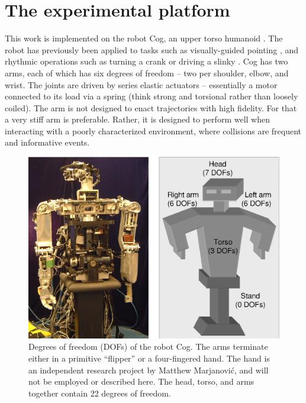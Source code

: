 
\section{The experimental platform}

This work is implemented on the robot Cog, an upper torso humanoid
\cite{brooks99cog}.  The robot has previously been applied to tasks
such as visually-guided pointing \cite{Marjanovic-96-SAB}, and
rhythmic operations such as turning a crank or driving a slinky
\cite{williamson98neural}.  Cog has two arms, each of which has six
degrees of freedom -- two per shoulder, elbow, and wrist.  The joints
are driven by series elastic actuators \cite{williamson95series} --
essentially a motor connected to its load via a spring (think strong
and torsional rather than loosely coiled).  The arm is not designed to
enact trajectories with high fidelity.  For that a very stiff arm is
preferable.  Rather, it is designed to perform well when interacting
with a poorly characterized environment, where collisions are frequent
and informative events.

\begin{figure}[tbh]
\centerline{
\includegraphics[width=12cm]{cog-schematic.eps}
}
\caption{ 
%
  Degrees of freedom (DOFs) of the robot Cog.  The arms terminate
  either in a primitive ``flipper'' or a four-fingered hand.  
\ifverbose
The hand
  is an independent research project by Matthew Marjanovi\'{c}, and
  will not be employed or described here.  
\fi
  The head, torso, and arms
  together contain 22 degrees of freedom.
%
}
\label{fig:cog-schematic}
\end{figure}


